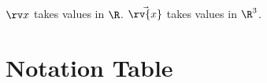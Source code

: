 \documentclass{article}
\begin{document}
$\rv x$ takes values in $\R$. $\vec{\rv{x}}$ takes values in $\R^3$.

\section*{Notation Table}
\NotationUsedTable
\end{document}
